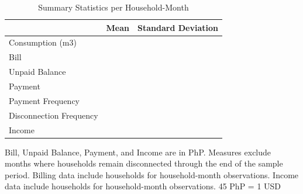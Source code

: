 \documentclass[12pt,table]{article}
\begin{document}
\begin{table}[h!] %
\centering
\caption{Summary Statistics per Household-Month}\label{table:descriptives_all}
\vspace{-2mm}
\begin{threeparttable}
\begin{tabular}{@{}l*{1}{KK}@{}}
\toprule
  & Mean & Standard Deviation \\
\midrule
Consumption (m3) &  &   \\
Bill &   &   \\
Unpaid Balance &   &   \\
Payment &   &   \\
Payment Frequency &   &   \\
Disconnection Frequency &   &   \\
Income &   &   \\
% 
\bottomrule
\end{tabular}
\begin{tablenotes}
\footnotesize
\item Bill, Unpaid Balance, Payment, and Income are in PhP.  Measures exclude months where households remain disconnected through the end of the sample period.  Billing data include households for household-month observations.  Income data include households for household-month observations.  45 PhP = 1 USD \,\,
\end{tablenotes}
\end{threeparttable}
\end{table}
\end{document}
